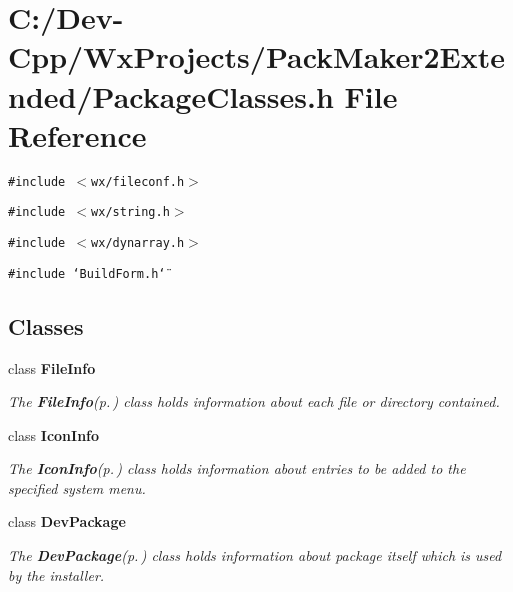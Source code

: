 \section{C:/Dev-Cpp/Wx\-Projects/Pack\-Maker2Extended/Package\-Classes.h File Reference}
\label{_package_classes_8h}
{\tt \#include $<$wx/fileconf.h$>$}\par
{\tt \#include $<$wx/string.h$>$}\par
{\tt \#include $<$wx/dynarray.h$>$}\par
{\tt \#include \char`\"{}Build\-Form.h\char`\"{}}\par
\subsection*{Classes}
\begin{CompactItemize}
\item 
class {\bf File\-Info}
\begin{CompactList}\small\item\em The {\bf File\-Info}{\rm (p.\,\pageref{class_file_info})} class holds information about each file or directory contained. \item\end{CompactList}\item 
class {\bf Icon\-Info}
\begin{CompactList}\small\item\em The {\bf Icon\-Info}{\rm (p.\,\pageref{class_icon_info})} class holds information about entries to be added to the specified system menu. \item\end{CompactList}\item 
class {\bf Dev\-Package}
\begin{CompactList}\small\item\em The {\bf Dev\-Package}{\rm (p.\,\pageref{class_dev_package})} class holds information about package itself which is used by the installer. \item\end{CompactList}\end{CompactItemize}
